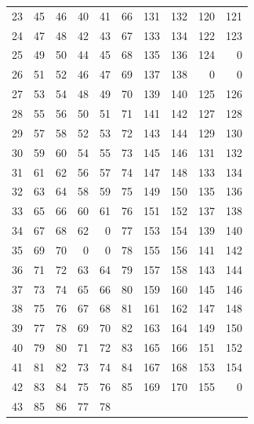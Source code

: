 \begin{longtable}{rrrrr@{\qquad}rrrrr}
23 & 45 & 46 & 40 & 41 & 66 & 131 & 132 & 120 & 121 \\
24 & 47 & 48 & 42 & 43 & 67 & 133 & 134 & 122 & 123 \\
25 & 49 & 50 & 44 & 45 & 68 & 135 & 136 & 124 & 0 \\
26 & 51 & 52 & 46 & 47 & 69 & 137 & 138 & 0 & 0 \\
27 & 53 & 54 & 48 & 49 & 70 & 139 & 140 & 125 & 126 \\
28 & 55 & 56 & 50 & 51 & 71 & 141 & 142 & 127 & 128 \\
29 & 57 & 58 & 52 & 53 & 72 & 143 & 144 & 129 & 130 \\
30 & 59 & 60 & 54 & 55 & 73 & 145 & 146 & 131 & 132 \\
31 & 61 & 62 & 56 & 57 & 74 & 147 & 148 & 133 & 134 \\
32 & 63 & 64 & 58 & 59 & 75 & 149 & 150 & 135 & 136 \\
33 & 65 & 66 & 60 & 61 & 76 & 151 & 152 & 137 & 138 \\
34 & 67 & 68 & 62 & 0 & 77 & 153 & 154 & 139 & 140 \\
35 & 69 & 70 & 0 & 0 & 78 & 155 & 156 & 141 & 142 \\
36 & 71 & 72 & 63 & 64 & 79 & 157 & 158 & 143 & 144 \\
37 & 73 & 74 & 65 & 66 & 80 & 159 & 160 & 145 & 146 \\
38 & 75 & 76 & 67 & 68 & 81 & 161 & 162 & 147 & 148 \\
39 & 77 & 78 & 69 & 70 & 82 & 163 & 164 & 149 & 150 \\
40 & 79 & 80 & 71 & 72 & 83 & 165 & 166 & 151 & 152 \\
41 & 81 & 82 & 73 & 74 & 84 & 167 & 168 & 153 & 154 \\
42 & 83 & 84 & 75 & 76 & 85 & 169 & 170 & 155 & 0 \\
43 & 85 & 86 & 77 & 78 &  &  &  &  &  \\
\bottomrule\end{longtable}\normalsize
